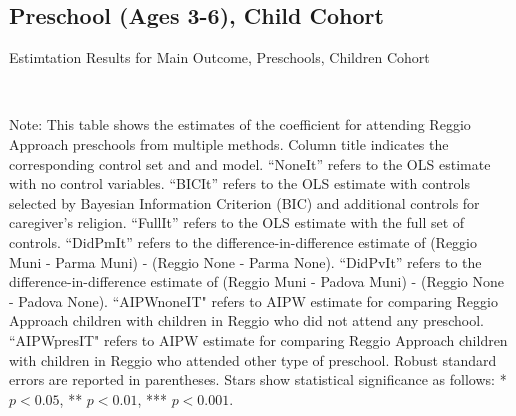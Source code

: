

\begin{landscape}
\subsection{Preschool (Ages 3-6), Child Cohort}

\begin{table}[H] \caption{Estimtation Results for Main Outcome, Preschools, Children Cohort} \label{ols-M-reg}
\scalebox{1}{}
\vspace{1ex} \\
\footnotesize\raggedright{Note: This table shows the estimates of the coefficient for attending Reggio Approach preschools from multiple methods. Column title indicates the corresponding control set and and model. ``NoneIt'' refers to the OLS estimate with no control variables. ``BICIt'' refers to the OLS estimate with controls selected by Bayesian Information Criterion (BIC) and additional controls for caregiver's religion. ``FullIt'' refers to the OLS estimate with the full set of controls. ``DidPmIt'' refers to the difference-in-difference estimate of (Reggio Muni - Parma Muni) - (Reggio None - Parma None). ``DidPvIt'' refers to the difference-in-difference estimate of (Reggio Muni - Padova Muni) - (Reggio None - Padova None).  ``AIPWnoneIT" refers to AIPW estimate for comparing Reggio Approach children with children in Reggio who did not attend any preschool. ``AIPWpresIT" refers to AIPW estimate for comparing Reggio Approach children with children in Reggio who attended other type of preschool. Robust standard errors are reported in parentheses. Stars show statistical significance as follows: * $p < 0.05$, ** $p < 0.01$, *** $p < 0.001$.}
\end{table}


\end{landscape}